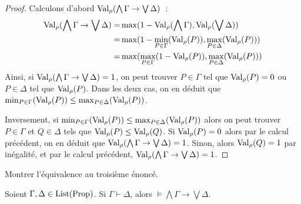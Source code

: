 \begin{proof}
  Calculons d'abord $\operatorname{Val}_\rho(\bigwedge\Gamma\to\bigvee\Delta)$~:
  \begin{align*}
    \operatorname{Val}_\rho(\bigwedge\Gamma\to\bigvee\Delta) =&
    \max(1 - \operatorname{Val}_\rho(\bigwedge\Gamma), \operatorname{Val}_\rho(\bigvee\Delta))\\
    =& \max(1 - \min_{P\in \Gamma}(\operatorname{Val}_\rho(P)),\max_{P\in\Delta}(\operatorname{Val}_\rho(P)))\\
    =& \max(\max_{P\in\Gamma}(1 - \operatorname{Val}_\rho(P)),\max_{P\in\Delta}(\operatorname{Val}_\rho(P)))
  \end{align*}
  Ainsi, si $\operatorname{Val}_\rho(\bigwedge\Gamma\to\bigvee\Delta) = 1$, on peut trouver
  $P\in\Gamma$ tel que $\operatorname{Val}_\rho(P) = 0$ ou $P\in\Delta$ tel que $\operatorname{Val}_\rho(P)$.
  Dans les deux cas, on en déduit que
  $\min_{P\in\Gamma}(\operatorname{Val}_\rho(P)) \leq \max_{P\in\Delta}(\operatorname{Val}_\rho(P))$.

  Inversement, si
  $\min_{P\in\Gamma}(\operatorname{Val}_\rho(P))\leq\max_{P\in\Delta}(\operatorname{Val}_\rho(P))$
  alors on peut trouver $P\in\Gamma$ et $Q\in\Delta$ tels que
  $\operatorname{Val}_\rho(P)\leq\operatorname{Val}_\rho(Q)$. Si $\operatorname{Val}_\rho(P) = 0$ alors par le calcul
  précédent, on en déduit que $\operatorname{Val}_\rho(\bigwedge\Gamma\to\bigvee\Delta) = 1$.
  Sinon, alors $\operatorname{Val}_\rho(Q) = 1$ par inégalité, et par le calcul précédent,
  $\operatorname{Val}_\rho(\bigwedge\Gamma\to\bigvee\Delta) = 1$.
\end{proof}

\begin{exercise}
  Montrer l'équivalence au troisième énoncé.
\end{exercise}

\begin{theorem}
  Soient $\Gamma,\Delta\in\operatorname{List}(\operatorname{Prop})$. Si $\Gamma\vdash\Delta$, alors
  $\models \bigwedge \Gamma\to \bigvee \Delta$.
\end{theorem}

